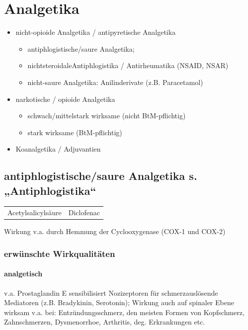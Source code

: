 \documentclass[10pt,a4paper]{report}
\begin{document}
\section{Analgetika} %
\label{sec:analgetika}
\begin{itemize}
	\item nicht-opioide Analgetika / antipyretische Analgetika
	\begin{itemize}
		\item antiphlogistische/saure Analgetika; 
		\item nichtsteroidaleAntiphlogistika / Antirheumatika (NSAID, NSAR)
		\item nicht-saure Analgetika: Anilinderivate (z.B. Paracetamol)
	\end{itemize}
	\item narkotische / opioide Analgetika
	\begin{itemize}
		\item schwach/mittelstark wirksame (nicht BtM-pflichtig)
		\item stark wirksame (BtM-pflichtig)
	\end{itemize}
	\item Koanalgetika / Adjuvantien
\end{itemize}
\subsection{antiphlogistische/saure Analgetika s. „Antiphlogistika“} %
 \label{sub:subsection_name}
\begin{tabularx}{\textwidth}{XX}
Acetylsalicylsäure&Diclofenac\\  
\end{tabularx} 
Wirkung v.a. durch Hemmung der Cyclooxygenase (COX-1 und COX-2)	 
\subsubsection{erwünschte Wirkqualitäten} %
\label{par:erw_nschte_wirkqualit_tten}
\paragraph{analgetisch} %
\label{subp:analgetisch}
v.a. Prostaglandin E sensibilisiert Nozizeptoren für schmerzauslösende Mediatoren (z.B. Bradykinin, Serotonin); Wirkung auch auf spinaler Ebene
wirksam v.a. bei: Entzündungsschmerz, den meisten Formen von Kopfschmerz, Zahnschmerzen, Dysmenorrhoe, Arthritis, deg. Erkrankungen etc.
\end{document}
